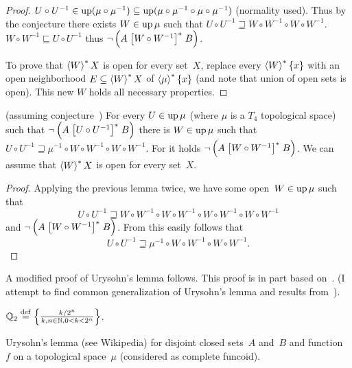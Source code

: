 \begin{proof}
  $U \circ U^{- 1} \in \operatorname{up} (\mu \circ \mu^{- 1}) \subseteq
  \operatorname{up} (\mu \circ \mu^{- 1} \circ \mu \circ
  \mu^{- 1})$ (normality used). Thus by the conjecture there exists $W
  \in \operatorname{up} \mu$ such that $U \circ U^{- 1} \sqsupseteq W \circ W^{-
  1} \circ W \circ W^{- 1}$. $W \circ W^{- 1} \sqsubseteq U \circ U^{- 1}$
  thus $\neg \left( A \mathrel{\left[W \circ W^{- 1}\right]^{\ast}} B \right)$.
  
  To prove that $\left\langle W\right\rangle ^{\ast}X$ is open for every set~$X$, replace every $\left\langle W\right\rangle ^{\ast}\{x\}$
  with an open neighborhood $E\subseteq\left\langle W\right\rangle ^{\ast}X$ of $\left\langle \mu\right\rangle ^{\ast}\{x\}$
  (and note that union of open sets is open).
  This new $W$ holds all necessary properties.
\end{proof}

\begin{lem}
  (assuming conjecture~) For every $U \in \operatorname{up} \mu$ (where $\mu$ is a $T_4$ topological space) such that
  $\neg \left( A \mathrel{\left[U \circ U^{- 1}\right]^{\ast}} B \right)$ there is $W \in \operatorname{up}\mu$
  such that $U \circ U^{- 1} \sqsupseteq \mu^{-1} \circ W \circ W^{-1}\circ W \circ W^{- 1}$.
  For it holds $\neg \left( A \mathrel{\left[W \circ W^{-
  1}\right]^{\ast}} B \right)$.
  We can assume that $\left\langle W\right\rangle ^{\ast}X$ is open for every set~$X$.
\end{lem}

\begin{proof}
Applying the previous lemma twice, we have some open~$W\in\operatorname{up}\mu$ such that
\[ U\circ U^{-1} \sqsupseteq W \circ W^{-1}\circ W \circ W^{- 1} \circ W \circ W^{-1}\circ W \circ W^{- 1} \]
and $\neg \left( A \mathrel{\left[W \circ W^{-1}\right]^{\ast}} B \right)$.
From this easily follows that \[ U \circ U^{- 1} \sqsupseteq \mu^{-1} \circ W \circ W^{-1}\circ W \circ W^{- 1}. \]
\end{proof}

A modified proof of Urysohn's lemma follows. This proof is in part based on~\cite{2014arXiv1410.1504B}.
(I attempt to find common generalization of Urysohn's lemma and results from~\cite{2014arXiv1410.1504B}).

$\mathbb{Q}_2 \overset{\mathrm{def}}{=} \left\{ \frac{ k/2^n }{k, n \in \mathbb{N}, 0 < k < 2^n }\right\}$.

\begin{thm}
Urysohn's lemma (see Wikipedia) for disjoint closed sets~$A$ and~$B$ and function~$f$ on a topological space~$\mu$
(considered as complete funcoid).
\end{thm}

